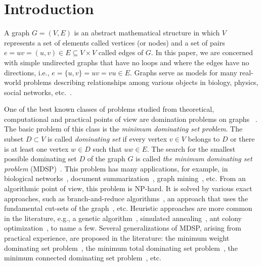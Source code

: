 \documentclass[dvipsnames,format=sigconf,anonymous=true,review=true]{acmart}
\begin{document}
\maketitle

\section{Introduction}
A graph $G=(V,E)$ is an abstract mathematical structure 
in which $V$ represents a set of elements called vertices (or nodes) and a set of pairs $e = uv =(u, v)  \in E \subseteq V \times V$ called edges of $G$. In this paper, we are concerned with simple undirected graphs that have no loops and where the edges have no directions, i.e., $e = \{u,v\} = uv = vu \in E$.   Graphs serve as models for many real-world problems describing relationships among various objects in biology, physics, social networks,  etc.~\cite{mashaghi2004investigation,pirzada2007applications,shah2019characterizing,doi:10.1137/S0895480100375831}. 

One of the best known classes of problems studied from theoretical, computational and practical points of view are domination problems on graphs~ \cite{haynes2013fundamentals}. The basic problem of this class is the \textit{minimum dominating set problem}. The subset $D \subset V$ is called \emph{dominating set} if every vertex $v\in V$ belongs to $D$ or there is at least one vertex $w\in D$ such that $uw\in E$. The search for the smallest possible dominating set $D$ of the graph $G$ is called \emph{the minimum dominating set problem} (MDSP)~\cite{grandoni2006note}. This problem has many applications, for example, in biological networks~\cite{nacher2016minimum}, document summarization~\cite{shen2010multi}, graph mining~\cite{chalupa2018order}, etc. From an algorithmic point of view, this problem is NP-hard. It is solved by various exact approaches, such as branch-and-reduce algorithms~\cite{van2011exact}, an approach that uses the fundamental cut-sets of the graph~\cite{karci2020new}, etc. Heuristic approaches are more common in the literature, e.g., a genetic algorithm~\cite{hedar2010hybrid}, simulated annealing~\cite{hedar2012simulated}, ant colony optimization~\cite{ho2006enhanced}, to name a few. Several generalizations of MDSP, arising from practical experience, are proposed in the literature: the minimum weight dominating set problem~\cite{romania2010ant}, the minimum total dominating set problem~\cite{yuan2019novel}, the minimum connected dominating set problem~\cite{butenko2004new}, etc.
\end{document}
